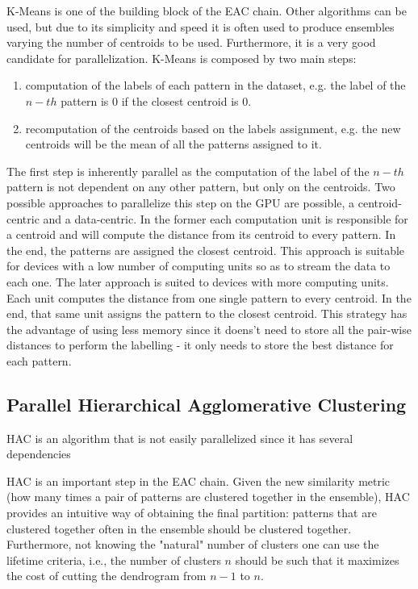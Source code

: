 K-Means is one of the building block of the EAC chain. Other algorithms can be used, but due to its simplicity and speed it is often used to produce ensembles varying the number of centroids to be used.
Furthermore, it is a very good candidate for parallelization. K-Means is composed by two main steps:

\begin{enumerate}
	\item computation of the labels of each pattern in the dataset, e.g. the label of the $n-th$ pattern is $0$ if the closest centroid is $0$.
	\item recomputation of the centroids based on the labels assignment, e.g. the new centroids will be the mean of all the patterns assigned to it.
\end{enumerate}

The first step is inherently parallel as the computation of the label of the $n-th$ pattern is not dependent on any other pattern, but only on the centroids. Two possible approaches to parallelize this step on the GPU are possible, a centroid-centric and a data-centric. In the former each computation unit is responsible for a centroid and will compute the distance from its centroid to every pattern. In the end, the patterns are assigned the closest centroid. This approach is suitable for devices with a low number of computing units so as to stream the data to each one.
The later approach is suited to devices with more computing units. Each unit computes the distance from one single pattern to every centroid. In the end, that same unit assigns the pattern to the closest centroid. This strategy has the advantage of using less memory since it doens't need to store all the pair-wise distances to perform the labelling - it only needs to store the best distance for each pattern.


\subsection{Parallel Hierarchical Agglomerative Clustering}



HAC is an algorithm that is not easily parallelized since it has several dependencies 

HAC is an important step in the EAC chain. Given the new similarity metric (how many times a pair of patterns are clustered together in the ensemble), HAC provides an intuitive way of obtaining the final partition: patterns that are clustered together often in the ensemble should be clustered together. Furthermore, not knowing the "natural" number of clusters one can use the lifetime criteria, i.e., the number of clusters $n$ should be such that it maximizes the cost of cutting the dendrogram from $n-1$ to $n$.

